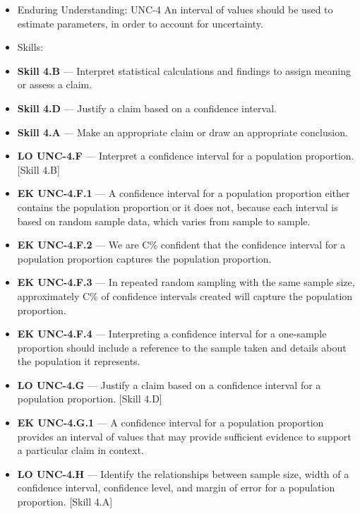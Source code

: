 \documentclass[11pt]{article}
\begin{document}


{\small
\begin{itemize}[leftmargin=1.5em,itemsep=2pt,topsep=2pt]
  \item Enduring Understanding: UNC-4 An interval of values should be used to estimate parameters, in order to account for uncertainty.
  \item Skills:
  \item \textbf{Skill 4.B} --- Interpret statistical calculations and findings to assign meaning or assess a claim.
  \item \textbf{Skill 4.D} --- Justify a claim based on a confidence interval.
  \item \textbf{Skill 4.A} --- Make an appropriate claim or draw an appropriate conclusion.
  \item \textbf{LO UNC-4.F} --- Interpret a confidence interval for a population proportion. [Skill 4.B]
  \item \textbf{EK UNC-4.F.1} --- A confidence interval for a population proportion either contains the population proportion or it does not, because each interval is based on random sample data, which varies from sample to sample.
  \item \textbf{EK UNC-4.F.2} --- We are C\% confident that the confidence interval for a population proportion captures the population proportion.
  \item \textbf{EK UNC-4.F.3} --- In repeated random sampling with the same sample size, approximately C\% of confidence intervals created will capture the population proportion.
  \item \textbf{EK UNC-4.F.4} --- Interpreting a confidence interval for a one-sample proportion should include a reference to the sample taken and details about the population it represents.
  \item \textbf{LO UNC-4.G} --- Justify a claim based on a confidence interval for a population proportion. [Skill 4.D]
  \item \textbf{EK UNC-4.G.1} --- A confidence interval for a population proportion provides an interval of values that may provide sufficient evidence to support a particular claim in context.
  \item \textbf{LO UNC-4.H} --- Identify the relationships between sample size, width of a confidence interval, confidence level, and margin of error for a population proportion. [Skill 4.A]

\end{itemize}}
\end{document}
